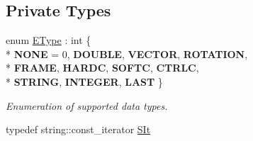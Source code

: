 \subsection*{Private Types}
\begin{DoxyCompactItemize}
\item 
enum \hyperlink{classgiskard__suturo_1_1GiskardLangParser_adbdbadf4ee4e2afb358b4ff98bf7daa2}{E\-Type} \-: int \{ \\*
{\bfseries N\-O\-N\-E} = 0, 
{\bfseries D\-O\-U\-B\-L\-E}, 
{\bfseries V\-E\-C\-T\-O\-R}, 
{\bfseries R\-O\-T\-A\-T\-I\-O\-N}, 
\\*
{\bfseries F\-R\-A\-M\-E}, 
{\bfseries H\-A\-R\-D\-C}, 
{\bfseries S\-O\-F\-T\-C}, 
{\bfseries C\-T\-R\-L\-C}, 
\\*
{\bfseries S\-T\-R\-I\-N\-G}, 
{\bfseries I\-N\-T\-E\-G\-E\-R}, 
{\bfseries L\-A\-S\-T}
 \}
\begin{DoxyCompactList}\small\item\em Enumeration of supported data types. \end{DoxyCompactList}\item 
typedef string\-::const\-\_\-iterator \hyperlink{classgiskard__suturo_1_1GiskardLangParser_aaebad1dc1afc92c7bdc1aa7e4d679621}{S\-It}
\end{DoxyCompactItemize}
